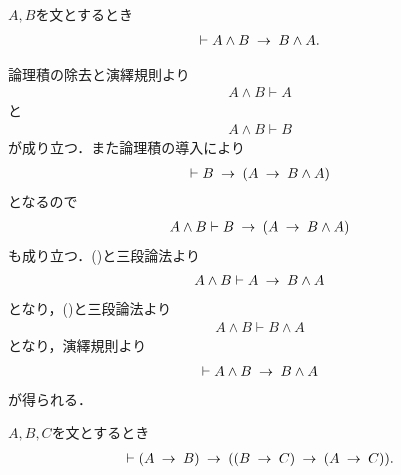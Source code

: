 	\begin{screen}
		\begin{logicalthm}[論理積の可換律]
		\label{logicalthm:commutative_law_of_conjunction}
			$A,B$を文とするとき
			\begin{align}
				\vdash A \wedge B \hspace{0.25em}\rightarrow\hspace{0.25em} B \wedge A.
			\end{align}
		\end{logicalthm}
	\end{screen}
	
	\begin{prf}
		論理積の除去と演繹規則より
		\begin{align}
			A \wedge B \vdash A
			\label{fom:logicalthm_commutative_law_of_conjunction_1}
		\end{align}
		と
		\begin{align}
			A \wedge B \vdash B
			\label{fom:logicalthm_commutative_law_of_conjunction_2}
		\end{align}
		が成り立つ．また論理積の導入により
		\begin{align}
			\vdash B \hspace{0.25em}\rightarrow\hspace{0.25em} (A \hspace{0.25em}\rightarrow\hspace{0.25em} B \wedge A)
		\end{align}
		となるので
		\begin{align}
			A \wedge B \vdash B \hspace{0.25em}\rightarrow\hspace{0.25em} (A \hspace{0.25em}\rightarrow\hspace{0.25em} B \wedge A)
		\end{align}
		も成り立つ．()と三段論法より
		\begin{align}
			A \wedge B \vdash A \hspace{0.25em}\rightarrow\hspace{0.25em} B \wedge A
		\end{align}
		となり，()と三段論法より
		\begin{align}
			A \wedge B \vdash B \wedge A
		\end{align}
		となり，演繹規則より
		\begin{align}
			\vdash A \wedge B \hspace{0.25em}\rightarrow\hspace{0.25em} B \wedge A
		\end{align}
		が得られる．
		\QED
	\end{prf}
	
	\begin{screen}
		\begin{logicalthm}[含意の推移律]
		\label{logicalthm:transitive_law_of_implication}
			$A,B,C$を文とするとき
			\begin{align}
				\vdash (A \hspace{0.25em}\rightarrow\hspace{0.25em} B) \hspace{0.25em}\rightarrow\hspace{0.25em} ((B \hspace{0.25em}\rightarrow\hspace{0.25em} C) \hspace{0.25em}\rightarrow\hspace{0.25em} (A \hspace{0.25em}\rightarrow\hspace{0.25em} C)).
			\end{align}
		\end{logicalthm}
	\end{screen}
	
